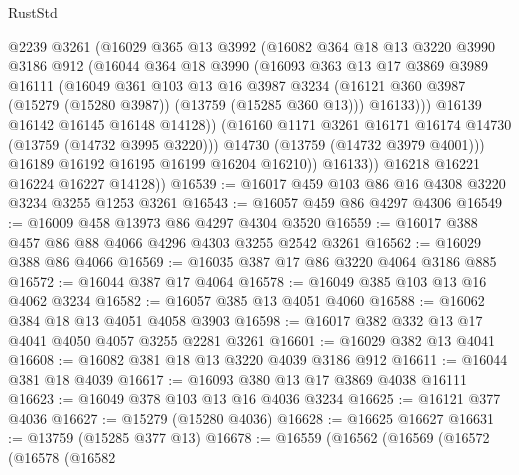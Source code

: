 \begin{lexlean}{RustStd}
\begin{coremodule}
                  @2239
                  @3261
                  (@16029
                    @365
                    @13
                    @3992
                    (@16082
                      @364
                      @18
                      @13
                      @3220
                      @3990
                      @3186
                      @912
                      (@16044
                        @364
                        @18
                        @3990
                        (@16093
                          @363
                          @13
                          @17
                          @3869
                          @3989
                          @16111
                          (@16049
                            @361
                            @103
                            @13
                            @16
                            @3987
                            @3234
                            (@16121 @360 @3987 (@15279 (@15280 @3987)) (@13759 (@15285 @360 @13)))
                            @16133)))
                      @16139
                      @16142
                      @16145
                      @16148
                      @14128))
                  (@16160 @1171 @3261 @16171 @16174 @14730 (@13759 (@14732 @3995 @3220)))
                  @14730
                  (@13759 (@14732 @3979 @4001)))
                @16189
                @16192
                @16195
                @16199
                @16204
                @16210))
            @16133))
        @16218
        @16221
        @16224
        @16227
        @14128))
@16539 := @16017 @459 @103 @86 @16 @4308 @3220 @3234 @3255 @1253 @3261
@16543 := @16057 @459 @86 @4297 @4306
@16549 := @16009 @458 @13973 @86 @4297 @4304 @3520
@16559 := @16017 @388 @457 @86 @88 @4066 @4296 @4303 @3255 @2542 @3261
@16562 := @16029 @388 @86 @4066
@16569 := @16035 @387 @17 @86 @3220 @4064 @3186 @885
@16572 := @16044 @387 @17 @4064
@16578 := @16049 @385 @103 @13 @16 @4062 @3234
@16582 := @16057 @385 @13 @4051 @4060
@16588 := @16062 @384 @18 @13 @4051 @4058 @3903
@16598 := @16017 @382 @332 @13 @17 @4041 @4050 @4057 @3255 @2281 @3261
@16601 := @16029 @382 @13 @4041
@16608 := @16082 @381 @18 @13 @3220 @4039 @3186 @912
@16611 := @16044 @381 @18 @4039
@16617 := @16093 @380 @13 @17 @3869 @4038 @16111
@16623 := @16049 @378 @103 @13 @16 @4036 @3234
@16625 := @16121 @377 @4036
@16627 := @15279 (@15280 @4036)
@16628 := @16625 @16627
@16631 := @13759 (@15285 @377 @13)
@16678 := @16559
    (@16562
      (@16569
        (@16572
          (@16578
            (@16582

\end{coremodule}
\end{lexlean}

